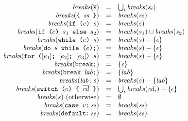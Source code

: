 \documentclass{article}
\newcommand{\seq}[1]{\overline{{#1}}}
\newcommand{\mathjs}[1]{\mbox{\texttt{{#1}}}}
\newcommand{\while}[2]{\mathjs{while (}{#1}\mathjs{) }{#2}}
\newcommand{\dowhile}[2]{\mathjs{do }{#1}\mathjs{ while (}{#2}\mathjs{);}}
\newcommand{\for}[4]{\mathjs{for (}{#1}\mathjs{; }{#2}\mathjs{; }{#3}\mathjs{) }{#4}}
\newcommand{\switch}[2]{\mathjs{switch (}{#1}\mathjs{) \char123{} }{#2}\mathjs{ \char125{}}}
\newcommand{\brk}{\mathjs{break;}}
\newcommand{\brkl}[1]{\mathjs{break }{#1}\mathjs{;}}
\newcommand{\lab}[2]{{#1}\mathjs{:}\,{#2}}
\newcommand{\ifthen}[2]{\mathjs{if (}{#1}\mathjs{) }{#2}}
\newcommand{\ifthenelse}[3]{\mathjs{if (}{#1}\mathjs{) }{#2}\mathjs{ else }{#3}}
\newcommand{\block}[1]{\mathjs{\char123{} }{#1}\mathjs{ \char125{}}}
\newcommand{\breaks}{\mathit{breaks}}
\begin{document}
\[
\begin{array}{rcl}
\breaks(\seq{s}) & = & \bigcup_i \breaks(s_i) \\
\breaks(\block{\mathit{ss}}) & = & \breaks(\mathit{ss}) \\
\breaks(\ifthen{e}{s}) & = & \breaks(s) \\
\breaks(\ifthenelse{e}{s_1}{s_2}) & = & \breaks(s_1) \cup \breaks(s_2) \\
\breaks(\while{e}{s}) & = & \breaks(s) - \{ \epsilon \} \\
\breaks(\dowhile{s}{e}) & = & \breaks(s) - \{ \epsilon \} \\
\breaks(\for{[e_1]}{[e_2]}{[e_3]}{s}) & = & \breaks(s) - \{ \epsilon \} \\
\breaks(\brk) & = & \{ \epsilon \} \\
\breaks(\brkl{\mathit{lab}}) & = & \{ \mathit{lab} \} \\
\breaks(\lab{\mathit{lab}}{s}) & = & \breaks(s) - \{ \mathit{lab} \} \\
\breaks(\switch{e}{\seq{\mathit{cd}}}) & = & \bigcup_i \breaks(\mathit{cd}_i) - \{ \epsilon \} \\
\breaks(s) \mbox{ (otherwise)} & = & \emptyset \\
\breaks(\mathjs{case }v\mathjs{:}\,\mathit{ss}) & = & \breaks(\mathit{ss}) \\
\breaks(\mathjs{default:}\,\mathit{ss}) & = & \breaks(\mathit{ss}) \\
\end{array}
\]
\end{document}

